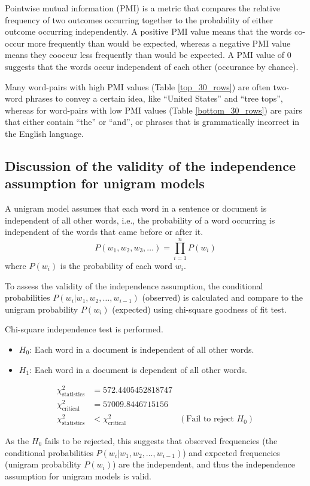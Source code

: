 Pointwise mutual information (PMI) is a metric that compares the relative frequency of two outcomes occurring together to the probability of either outcome occurring independently.
A positive PMI value means that the words co-occur more frequently than would be expected, whereas a negative PMI value means they cooccur less frequently than would be expected.
A PMI value of 0 suggests that the words occur independent of each other (occurance by chance).

Many word-pairs with high PMI values (Table \ref{top_30_rows}) are often two-word phrases to convey a certain idea, like ``United States'' and ``tree tops'', 
whereas for word-pairs with low PMI values (Table \ref{bottom_30_rows}) are pairs that either contain ``the'' or ``and'', or phrases that is grammatically incorrect in the English language. 


\subsection*{Discussion of the validity of the independence assumption for unigram models}

A unigram model assumes that each word in a sentence or document is independent of all other words, 
i.e., the probability of a word occurring is independent of the words that came before or after it.
$$P(w_1, w_2, w_3, \dots) = \prod^{n}_{i=1} P(w_i)$$
where $P(w_i)$ is the probability of each word $w_i$.

To assess the validity of the independence assumption, 
the conditional probabilities $P(w_i | w_1, w_2, \dots, w_{i-1})$ (observed) is calculated
and compare to the unigram probability $P(w_i)$ (expected)
using chi-square goodness of fit test.

Chi-square independence test is performed.
\begin{itemize}
    \item $H_0$: Each word in a document is independent of all other words.
    \item $H_1$: Each word in a document is dependent of all other words.
\end{itemize}

\begin{align*}
    \chi^2_{\text{statistics}} & = 572.4405452818747 \\
    \chi^2_{\text{critical}} & = 57009.8446715156 \\
    \chi^2_{\text{statistics}} & < \chi^2_{\text{critical}} & (\text{Fail to reject } H_0)
\end{align*}

As the $H_0$ fails to be rejected, this suggests that observed frequencies (the conditional probabilities $P(w_i | w_1, w_2, \dots, w_{i-1})$) and expected frequencies (unigram probability $P(w_i)$) are the independent, and thus the independence assumption for unigram models is valid.
